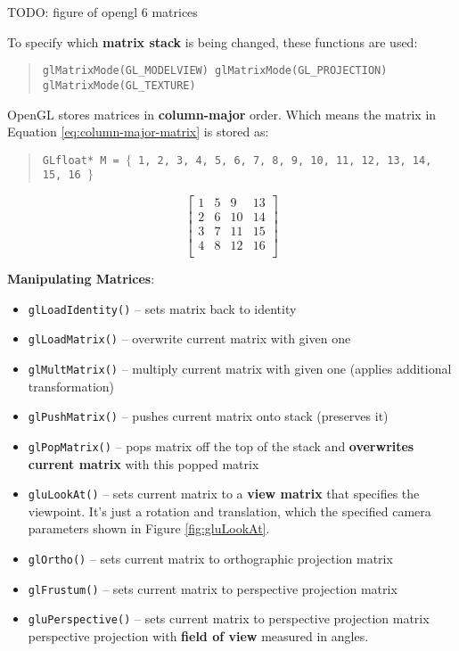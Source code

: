 \documentclass{article}
\begin{document}
TODO: figure of opengl 6 matrices

To specify which \textbf{matrix stack} is being changed, these functions are used:
\begin{quote}
\texttt{glMatrixMode(GL\_MODELVIEW)
glMatrixMode(GL\_PROJECTION)
glMatrixMode(GL\_TEXTURE)
}
\end{quote}

OpenGL stores matrices in \textbf{column-major} order. Which means the matrix in Equation \ref{eq:column-major-matrix} is stored as:
\begin{quote}
	\texttt{GLfloat* M = $\lbrace$ 1, 2, 3, 4, 5, 6, 7, 8, 9, 10, 11, 12, 13, 14, 15, 16 $\rbrace$ }
\end{quote}
\begin{equation}
	\left[ \begin{matrix}
	1 & 5 & 9 & 13 \\
	2 & 6 & 10 & 14 \\
	3 & 7 & 11 & 15 \\
	4 & 8 & 12 & 16 \\
	\end{matrix} \right]
\end{equation}

\textbf{Manipulating Matrices}:
\begin{itemize}
	\item \texttt{glLoadIdentity()} -- sets matrix back to identity
	\item \texttt{glLoadMatrix()} -- overwrite current matrix with given one
	\item \texttt{glMultMatrix()} -- multiply current matrix with given one (applies additional transformation)
	\item \texttt{glPushMatrix()} -- pushes current matrix onto stack (preserves it)
	\item \texttt{glPopMatrix()} -- pops matrix off the top of the stack and \textbf{overwrites current matrix} with this popped matrix
	\item \texttt{gluLookAt()} -- sets current matrix to a \textbf{view matrix} that specifies the viewpoint. It's just a rotation and translation, which the specified camera parameters shown in Figure \ref{fig:gluLookAt}.
	\item \texttt{glOrtho()} -- sets current matrix to orthographic projection matrix
	\item \texttt{glFrustum()} -- sets current matrix to perspective projection matrix
	\item \texttt{gluPerspective()} -- sets current matrix to perspective projection matrix perspective projection with \textbf{field of view} measured in angles.
\end{itemize}
\end{document}
